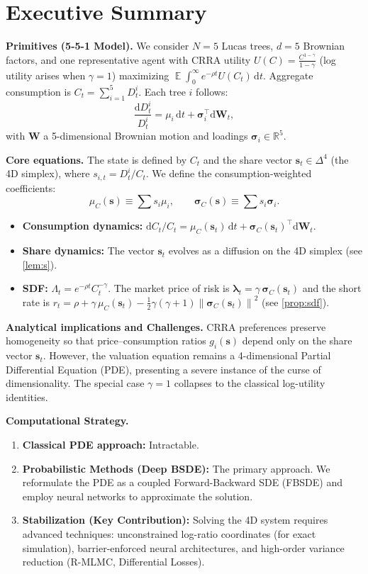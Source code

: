 \documentclass[11pt,letterpaper,oneside]{article}
\numberwithin{equation}{section}
\DeclareMathOperator{\E}{\mathbb{E}}
\newcommand{\R}{\mathbb{R}}
\newcommand{\1}{\mathbf{1}}
\newcommand{\diff}{\mathrm{d}}
\newcommand{\norm}[1]{\left\lVert #1\right\rVert}
\begin{document}
\section*{Executive Summary }
\begin{tcolorbox}[didacticstyle]
\textbf{Primitives (5-5-1 Model).}
We consider $N=5$ Lucas trees, $d=5$ Brownian factors, and one representative agent with CRRA utility $U(C)=\frac{C^{1-\gamma}}{1-\gamma}$ (log utility arises when $\gamma=1$) maximizing $\E\!\int_0^\infty e^{-\rho t}U(C_t)\,\diff t$. Aggregate consumption is $C_t=\sum_{i=1}^5 D^i_t$. Each tree $i$ follows:
\[
  \frac{\diff D^i_t}{D^i_t}=\mu_i\,\diff t+\bm{\sigma}_i^{\top}\diff \bm{W}_t,
\]
with $\bm{W}$ a 5-dimensional Brownian motion and loadings $\bm{\sigma}_i \in \R^5$.

\textbf{Core equations.} The state is defined by $C_t$ and the share vector $\bm{s}_t \in \Delta^{4}$ (the 4D simplex), where $s_{i,t}=D^i_t/C_t$. We define the consumption-weighted coefficients:
\[
\mu_C(\bm{s}) \equiv \sum s_i \mu_i, \qquad \bm{\sigma}_C(\bm{s}) \equiv \sum s_i \bm{\sigma}_i.
\]
\begin{itemize}[leftmargin=1.25em]
  \item \textbf{Consumption dynamics:} $\diff C_t/C_t = \mu_C(\bm{s}_t)\,\diff t + \bm{\sigma}_C(\bm{s}_t)^{\top}\diff\bm{W}_t$.
  \item \textbf{Share dynamics:} The vector $\bm{s}_t$ evolves as a diffusion on the 4D simplex (see \cref{lem:s}).
  \item \textbf{SDF:} $\Lambda_t=e^{-\rho t}C_t^{-\gamma}$. The market price of risk is $\bm{\lambda}_t=\gamma\,\bm{\sigma}_C(\bm{s}_t)$ and the short rate is $r_t=\rho+\gamma\,\mu_C(\bm{s}_t)-\tfrac12\gamma(\gamma+1)\norm{\bm{\sigma}_C(\bm{s}_t)}^2$ (see \cref{prop:sdf}).
\end{itemize}

\textbf{Analytical implications and Challenges.} CRRA preferences preserve homogeneity so that price--consumption ratios $g_i(\bm{s})$ depend only on the share vector $\bm{s}_t$. However, the valuation equation remains a 4-dimensional Partial Differential Equation (PDE), presenting a severe instance of the curse of dimensionality. The special case $\gamma=1$ collapses to the classical log-utility identities.

\textbf{Computational Strategy.}
\begin{enumerate}[leftmargin=1.25em]
  \item \textbf{Classical PDE approach:} Intractable.
  \item \textbf{Probabilistic Methods (Deep BSDE):} The primary approach. We reformulate the PDE as a coupled Forward-Backward SDE (FBSDE) and employ neural networks to approximate the solution.
  \item \textbf{Stabilization (Key Contribution):} Solving the 4D system requires advanced techniques: unconstrained log-ratio coordinates (for exact simulation), barrier-enforced neural architectures, and high-order variance reduction (R-MLMC, Differential Losses).
\end{enumerate} 
\end{tcolorbox} 
\end{document}
